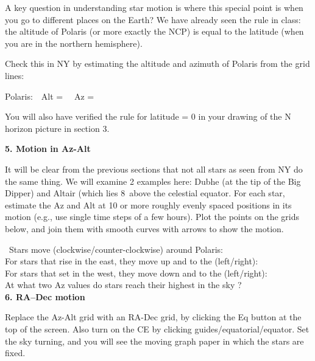 \documentclass[12pt]{article}
\begin{document}
A key question in understanding star motion is where this special
point is when you go to different places on the Earth?  We have
already seen the rule in class: the altitude of Polaris (or more
exactly the NCP) is equal to the latitude (when you are in the northern
hemisphere).

\bigskip
Check this in NY by estimating the altitude and azimuth of Polaris
from the grid lines:
\bigskip

Polaris:\ \ Alt = \makebox[4cm]{\hrulefill} \ \ Az =  \makebox[4cm]{\hrulefill}

\bigskip
You will also have verified the rule for latitude = 0 in your drawing
of the N horizon picture in section 3.

\vspace{4cm}
\bigskip\noindent
{\bf 5. Motion in Az-Alt}

\medskip\noindent
It will be clear from the previous sections that not all stars as seen
from NY do the same thing. We will examine 2 examples here: Dubhe (at
the tip of the Big Dipper) and Altair (which lies 8\deg\ above the
celestial equator.  For each star, estimate the Az and Alt at 10 or
more roughly evenly spaced positions in its motion (e.g., use single
time steps of a few hours). Plot the points on the grids below, and
join them with smooth curves with arrows to show the motion.

\newpage
        \begin{figure*}[h]
        \centerline{}
         \end{figure*}

\,
\bigskip
\noindent
Stars move (clockwise/counter-clockwise) around Polaris:\
\makebox[4cm]{\hrulefill}\\ 
For stars that rise in the east, they move up and to the
(left/right): \makebox[4cm]{\hrulefill}\\ 
For stars that set in the west, they move down and to the
(left/right): \makebox[4cm]{\hrulefill}\\ 
At what two Az values do  stars reach their highest in the sky ?\
\makebox[4cm]{\hrulefill} \\


\bigskip\noindent
{\bf 6. RA--Dec motion}

\medskip\noindent
Replace the Az-Alt grid with an RA-Dec grid, by clicking the Eq button
at the top of the screen. Also turn on the CE by clicking
guides/equatorial/equator. Set the sky turning, and you will see the
moving graph paper in which the stars are fixed.
\end{document}
